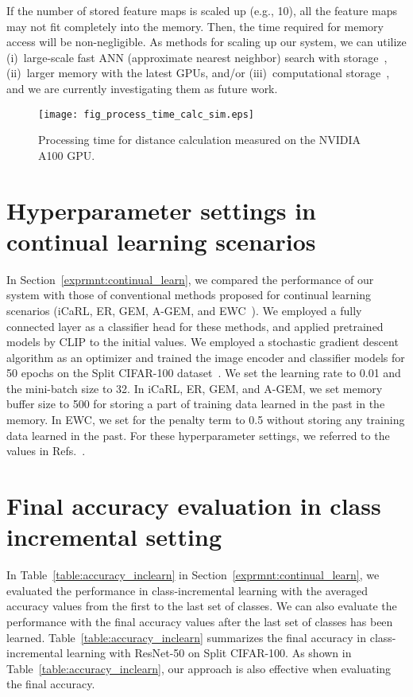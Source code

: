 \documentclass[runningheads]{llncs}
\begin{document}
If the number of stored feature maps is scaled up (e.g., 10), all the feature maps may not fit completely into the memory.
Then, the time required for memory access will be non-negligible.
As methods for scaling up our system, we can utilize
(i)~large-scale fast ANN (approximate nearest neighbor) search with storage~\cite{SPANN,FAISS},
(ii)~larger memory with the latest GPUs, and/or (iii)~computational storage~\cite{CompStorage},
and we are currently investigating them as future work.


\begin{figure}[h]
   \begin{center}
   \texttt{[image: fig\_process\_time\_calc\_sim.eps]}
   \end{center}
   \caption{Processing time for distance calculation measured on the NVIDIA A100 GPU.}
   \label{fig_process_time}
\end{figure}


\section{Hyperparameter settings in continual learning scenarios}
\label{sec:hyperparam}

In Section~\ref{exprmnt:continual_learn}, we compared the performance of our system with those of conventional methods proposed for continual learning scenarios (iCaRL, ER, GEM, A-GEM, and EWC~\cite{iCaRL,ER,GEM,AGEM,EWC}).
We employed a fully connected layer as a classifier head for these methods, and applied pretrained models by CLIP to the initial values.
We employed a stochastic gradient descent algorithm as an optimizer and trained the image encoder and classifier models for 50 epochs on the Split CIFAR-100 dataset~\cite{AGEM,SplitCIFAR100}.
We set the learning rate to 0.01 and the mini-batch size to 32.
In iCaRL, ER, GEM, and A-GEM, we set memory buffer size to 500 for storing a part of training data learned in the past in the memory.
In EWC, we set  for the penalty term to 0.5 without storing any training data learned in the past.
For these hyperparameter settings, we referred to the values in Refs.~\cite{DARK_ER,ERTrick}.



\section{Final accuracy evaluation in class incremental setting} 

In Table~\ref{table:accuracy_inclearn} in Section~\ref{exprmnt:continual_learn}, we evaluated the performance in class-incremental learning with the averaged accuracy values from the first to the last set of classes.
We can also evaluate the performance with the final accuracy values after the last set of classes has been learned.
Table~\ref{table:accuracy_inclearn} summarizes the final accuracy in class-incremental learning with ResNet-50 on Split CIFAR-100.
As shown in Table~\ref{table:accuracy_inclearn}, our approach is also effective when evaluating the final accuracy.
\end{document}
